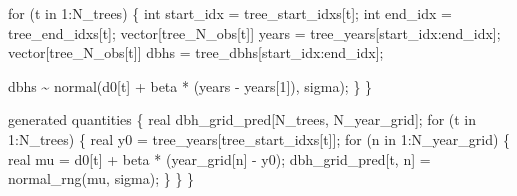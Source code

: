 \documentclass[
  letterpaper,
  DIV=11,
  numbers=noendperiod]{scrartcl}
\newenvironment{Shaded}{\begin{snugshade}}{\end{snugshade}}
\newcommand{\ControlFlowTok}[1]{\textcolor[rgb]{0.00,0.23,0.31}{#1}}
\newcommand{\DataTypeTok}[1]{\textcolor[rgb]{0.68,0.00,0.00}{#1}}
\newcommand{\DecValTok}[1]{\textcolor[rgb]{0.68,0.00,0.00}{#1}}
\newcommand{\FunctionTok}[1]{\textcolor[rgb]{0.28,0.35,0.67}{#1}}
\newcommand{\KeywordTok}[1]{\textcolor[rgb]{0.00,0.23,0.31}{#1}}
\newcommand{\NormalTok}[1]{\textcolor[rgb]{0.00,0.23,0.31}{#1}}
\newcommand{\OtherTok}[1]{\textcolor[rgb]{0.00,0.23,0.31}{#1}}
\newcommand{\SpecialCharTok}[1]{\textcolor[rgb]{0.37,0.37,0.37}{#1}}
\newcommand{\StringTok}[1]{\textcolor[rgb]{0.13,0.47,0.30}{#1}}
\begin{document}
\begin{codelisting}
\begin{Shaded}
\begin{Highlighting}[]
  \ControlFlowTok{for}\NormalTok{ (t }\ControlFlowTok{in} \DecValTok{1}\NormalTok{:N\_trees) \{}
    \DataTypeTok{int}\NormalTok{ start\_idx = tree\_start\_idxs[t];}
    \DataTypeTok{int}\NormalTok{ end\_idx = tree\_end\_idxs[t];}
    \DataTypeTok{vector}\NormalTok{[tree\_N\_obs[t]] years = tree\_years[start\_idx:end\_idx];}
    \DataTypeTok{vector}\NormalTok{[tree\_N\_obs[t]] dbhs = tree\_dbhs[start\_idx:end\_idx];}
    
\NormalTok{    dbhs \textasciitilde{} normal(d0[t] + beta * (years {-} years[}\DecValTok{1}\NormalTok{]), sigma);}
\NormalTok{  \}}
\NormalTok{\}}

\KeywordTok{generated quantities}\NormalTok{ \{}
  \DataTypeTok{real}\NormalTok{ dbh\_grid\_pred[N\_trees, N\_year\_grid];}
  \ControlFlowTok{for}\NormalTok{ (t }\ControlFlowTok{in} \DecValTok{1}\NormalTok{:N\_trees) \{}
    \DataTypeTok{real}\NormalTok{ y0 = tree\_years[tree\_start\_idxs[t]];}
    \ControlFlowTok{for}\NormalTok{ (n }\ControlFlowTok{in} \DecValTok{1}\NormalTok{:N\_year\_grid) \{}
      \DataTypeTok{real}\NormalTok{ mu = d0[t] + beta * (year\_grid[n] {-} y0);}
\NormalTok{      dbh\_grid\_pred[t, n] = normal\_rng(mu, sigma);}
\NormalTok{    \}}
\NormalTok{  \}}
\NormalTok{\}}
\end{Highlighting}
\end{Shaded}

\end{codelisting}

\begin{Shaded}
\end{Shaded}
\end{document}
